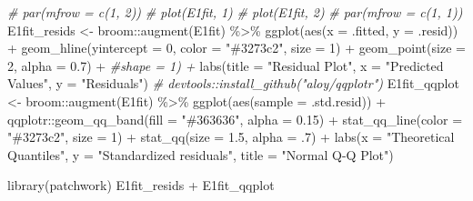 \documentclass[
]{book}
\newenvironment{Shaded}{\begin{snugshade}}{\end{snugshade}}
\newcommand{\AttributeTok}[1]{\textcolor[rgb]{0.77,0.63,0.00}{#1}}
\newcommand{\CommentTok}[1]{\textcolor[rgb]{0.56,0.35,0.01}{\textit{#1}}}
\newcommand{\DecValTok}[1]{\textcolor[rgb]{0.00,0.00,0.81}{#1}}
\newcommand{\FloatTok}[1]{\textcolor[rgb]{0.00,0.00,0.81}{#1}}
\newcommand{\FunctionTok}[1]{\textcolor[rgb]{0.00,0.00,0.00}{#1}}
\newcommand{\NormalTok}[1]{#1}
\newcommand{\OtherTok}[1]{\textcolor[rgb]{0.56,0.35,0.01}{#1}}
\newcommand{\SpecialCharTok}[1]{\textcolor[rgb]{0.00,0.00,0.00}{#1}}
\newcommand{\StringTok}[1]{\textcolor[rgb]{0.31,0.60,0.02}{#1}}
\begin{document}
\begin{Shaded}
\begin{Highlighting}[]
\CommentTok{\# par(mfrow = c(1, 2))}
\CommentTok{\# plot(E1fit, 1)}
\CommentTok{\# plot(E1fit, 2)}
\CommentTok{\# par(mfrow = c(1, 1))}
\NormalTok{E1fit\_resids }\OtherTok{\textless{}{-}}\NormalTok{ broom}\SpecialCharTok{::}\FunctionTok{augment}\NormalTok{(E1fit) }\SpecialCharTok{\%\textgreater{}\%} 
  \FunctionTok{ggplot}\NormalTok{(}\FunctionTok{aes}\NormalTok{(}\AttributeTok{x =}\NormalTok{ .fitted, }\AttributeTok{y =}\NormalTok{ .resid)) }\SpecialCharTok{+} 
  \FunctionTok{geom\_hline}\NormalTok{(}\AttributeTok{yintercept =} \DecValTok{0}\NormalTok{, }\AttributeTok{color =} \StringTok{"\#3273c2"}\NormalTok{, }\AttributeTok{size =} \DecValTok{1}\NormalTok{) }\SpecialCharTok{+}
  \FunctionTok{geom\_point}\NormalTok{(}\AttributeTok{size =} \DecValTok{2}\NormalTok{, }\AttributeTok{alpha =} \FloatTok{0.7}\NormalTok{) }\SpecialCharTok{+} \CommentTok{\#shape = 1) +}
  \FunctionTok{labs}\NormalTok{(}\AttributeTok{title =} \StringTok{"Residual Plot"}\NormalTok{, }
       \AttributeTok{x =} \StringTok{"Predicted Values"}\NormalTok{, }
       \AttributeTok{y =} \StringTok{"Residuals"}\NormalTok{)}
\CommentTok{\# devtools::install\_github("aloy/qqplotr")}
\NormalTok{E1fit\_qqplot }\OtherTok{\textless{}{-}}\NormalTok{ broom}\SpecialCharTok{::}\FunctionTok{augment}\NormalTok{(E1fit) }\SpecialCharTok{\%\textgreater{}\%} 
  \FunctionTok{ggplot}\NormalTok{(}\FunctionTok{aes}\NormalTok{(}\AttributeTok{sample =}\NormalTok{ .std.resid)) }\SpecialCharTok{+}
\NormalTok{  qqplotr}\SpecialCharTok{::}\FunctionTok{geom\_qq\_band}\NormalTok{(}\AttributeTok{fill =} \StringTok{"\#363636"}\NormalTok{, }\AttributeTok{alpha =} \FloatTok{0.15}\NormalTok{) }\SpecialCharTok{+}
  \FunctionTok{stat\_qq\_line}\NormalTok{(}\AttributeTok{color =} \StringTok{"\#3273c2"}\NormalTok{, }\AttributeTok{size =} \DecValTok{1}\NormalTok{) }\SpecialCharTok{+}
  \FunctionTok{stat\_qq}\NormalTok{(}\AttributeTok{size =} \FloatTok{1.5}\NormalTok{, }\AttributeTok{alpha =}\NormalTok{ .}\DecValTok{7}\NormalTok{) }\SpecialCharTok{+}
  \FunctionTok{labs}\NormalTok{(}\AttributeTok{x =} \StringTok{"Theoretical Quantiles"}\NormalTok{,}
       \AttributeTok{y =} \StringTok{"Standardized residuals"}\NormalTok{,}
       \AttributeTok{title =} \StringTok{"Normal Q{-}Q Plot"}\NormalTok{)}

\FunctionTok{library}\NormalTok{(patchwork)}
\NormalTok{E1fit\_resids }\SpecialCharTok{+}\NormalTok{ E1fit\_qqplot}
\end{Highlighting}
\end{Shaded}
\end{document}
